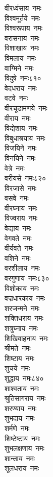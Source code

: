 \begin{multicols}{\maxColumns}
\begin{flushleft}
वीरध्वंसाय~नमः\\
विश्वमूर्तये~नमः\\
विश्वरूपाय~नमः\\
वरासनाय~नमः\\
विशाखाय~नमः\\
विमलाय~नमः\\
वाग्मिने~नमः\\
विदुषे~नमः\hfill ८१०\\
वेदधराय~नमः\\
वटवे~नमः\\
वीरचूडामणये~नमः\\
वीराय~नमः\\
विद्येशाय~नमः\\
विबुधाश्रयाय~नमः\\
विजयिने~नमः\\
विनयिने~नमः\\
वेत्रे~नमः\\
वरीयसे~नमः\hfill ८२०\\
विरजासे~नमः\\
वसवे~नमः\\
वीरघ्नाय~नमः\\
विज्वराय~नमः\\
वेद्याय~नमः\\
वेगवते~नमः\\
वीर्यवते~नमः\\
वशिने~नमः\\
वरशीलाय~नमः\\
वरगुणाय~नमः\hfill ८३०\\
विशोकाय~नमः\\
वज्रधारकाय~नमः\\
शरजन्मने~नमः\\
शक्तिधराय~नमः\\
शत्रुघ्नाय~नमः\\
शिखिवाहनाय~नमः\\
श्रीमते~नमः\\
शिष्टाय~नमः\\
शुचये~नमः\\
शुद्धाय~नमः\hfill ८४०\\
शाश्वताय~नमः\\
श्रुतिसागराय~नमः\\
शरण्याय~नमः\\
शुभदाय~नमः\\
शर्मणे~नमः\\
शिष्टेष्टाय~नमः\\
शुभलक्षणाय~नमः\\
शान्ताय~नमः\\
शूलधराय~नमः\\

\end{flushleft}
\end{multicols}
